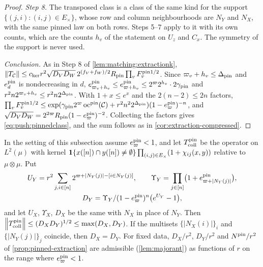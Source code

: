 \begin{proof}
\emph{Step 8.} The transposed class is a class of the same kind for the support
$\{(j,i):(i,j)\in E_\times\}$, whose row and column neighbourhoods are $N_Y$ and
$N_X$, with the same pinned law on both rows. Steps 5--7 apply to it with its own
counts, which are the counts $h_v$ of the statement on $U_z$ and $C_x$. The symmetry
of the support is never used.

\emph{Conclusion.} As in Step 8 of \cref{lem:matching:extractionk},
$\norm{T_{\mathcal C}}\le c_{\rm ker}r^2\sqrt{D_VD_W}\,2^{(f_V+f_W)/2}R_{\rm pin}
\prod_vF^{\rm pin}_v{}^{1/2}$. Since $\varpi_v+h_v\le\Delta_{\rm pin}$ and
$e^{\rm pin}_d$ is nondecreasing in $d$,
$e^{\rm pin}_{\varpi_v+h_v}\le e^{\rm pin}_{\varpi+h_v}\le2^\varpi2^{h_v}\cdot2\gamma_{\rm pin}$
and $r^2n2^{\varpi_v+h_v}\le r^2n2^{\Delta_{\rm pin}}$. With $1+x\le e^x$ and the
$2(n-2)\le2n$ factors,
$\prod_vF^{\rm pin}_v{}^{1/2}\le\exp(\gamma_{\rm pin}2^\varpi\,\mathrm{oc}^{\mathrm{pin}}(\mathcal C)
+r^2n^22^{\Delta_{\rm pin}})(1-e^{\rm pin}_\varpi)^{-n}$, and
$\sqrt{D_VD_W}=2^{2\varpi}R_{\rm pin}(1-e^{\rm pin}_\varpi)^{-2}$. Collecting the
factors gives \eqref{eq:push:pinnedclass}, and the sum follows as in
\cref{cor:extraction-compressed}.
\end{proof}

\begin{proposition}\label{prop:pinned-collision}
In the setting of this subsection assume $e^{\rm pin}_\varpi<1$, and let
$T^{\rm pin}_{\rm coll}$ be the operator on $L^2(\mu)$ with kernel
$\one\{x([n])\cap y([n])\ne\emptyset\}\prod_{(i,j)\in E_\times}(1+\chi_{ij}(x,y))$
relative to $\mu\otimes\mu$. Put
\[
\begin{gathered}
 U_Y=r^2\sum_{j,i\in[n]}2^{\varpi+|N_Y(j)|-[i\in N_Y(j)]},\qquad
 \Upsilon_Y=\prod_{j\in[n]}\bigl(1+e^{\rm pin}_{\varpi+|N_Y(j)|}\bigr),\\
 D_Y=\frac{\Upsilon_Y}{(1-e^{\rm pin}_\varpi)^n}\bigl(e^{U_Y}-1\bigr),
\end{gathered}
\]
and let $U_X$, $\Upsilon_X$, $D_X$ be the same with $N_X$ in place of $N_Y$. Then
$\norm{T^{\rm pin}_{\rm coll}}\le(D_XD_Y)^{1/2}\le\max(D_X,D_Y)$. If the multisets
$\{|N_X(i)|\}_i$ and $\{|N_Y(j)|\}_j$ coincide, then $D_X=D_Y$. For fixed data,
$D_X/r^2$, $D_Y/r^2$ and $N^{\rm pin}/r^2$ of \cref{prop:pinned-extraction} are
admissible (\cref{lem:majorant}) as functions of $r$ on the range where
$e^{\rm pin}_\varpi<1$.
\end{proposition}

